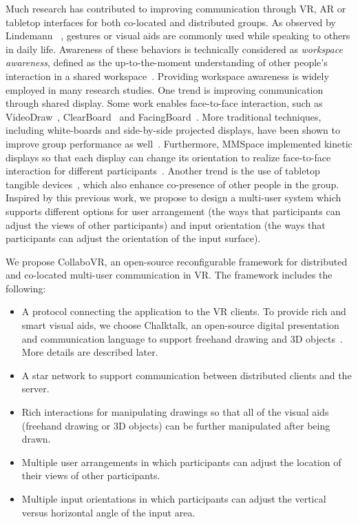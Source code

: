 \documentclass{sigchi}
\begin{document}
Much research has contributed to improving communication through VR, AR or tabletop interfaces for both co-located and distributed groups. As observed by Lindemann ~\cite{tversky2003human}, gestures or visual aids are commonly used while speaking to others in daily life. Awareness of these behaviors is technically considered as \textit{workspace awareness}, defined as the up-to-the-moment understanding of other people's interaction in a shared workspace~\cite{li2014interactive}. Providing workspace awareness is widely employed in many research studies. 
One trend is improving communication through shared display. Some work enables face-to-face interaction, such as VideoDraw~\cite{tang1990videodraw}, ClearBoard~\cite{ishii1993integration} and FacingBoard~\cite{li2014interactive}. More traditional techniques, including white-boards and side-by-side projected displays, have been shown to improve group performance as well~\cite{plaue2009presence}. Furthermore, MMSpace implemented kinetic displays so that each display can change its orientation to realize face-to-face interaction for different participants~\cite{otsuka2016mmspace}.
Another trend is the use of tabletop tangible devices~\cite{brave1998tangible, kunert2019multi}, which also enhance co-presence of other people in the group. Inspired by this previous work, we propose to design a multi-user system which supports different options for user arrangement (the ways that participants can adjust the views of other participants) and input orientation (the ways that participants can adjust the orientation of the input surface).

We propose CollaboVR, an open-source reconfigurable framework for distributed and co-located multi-user communication in VR. The framework includes the following:
\begin{itemize}
    \item A protocol connecting the application to the VR clients. To provide rich and smart visual aids, we choose Chalktalk, an open-source digital presentation and communication language to support freehand drawing and 3D objects~\cite{perlin2018chalktalk}. More details are described later.
    \item A star network to support communication between distributed clients and the server.
    \item Rich interactions for manipulating drawings so that all of the visual aids (freehand drawing or 3D objects) can be further manipulated after being drawn.
    \item Multiple user arrangements in which participants can adjust the location of their views of other participants.
    \item Multiple input orientations in which participants can adjust the vertical versus horizontal angle of the input area.
\end{itemize}
\end{document}
